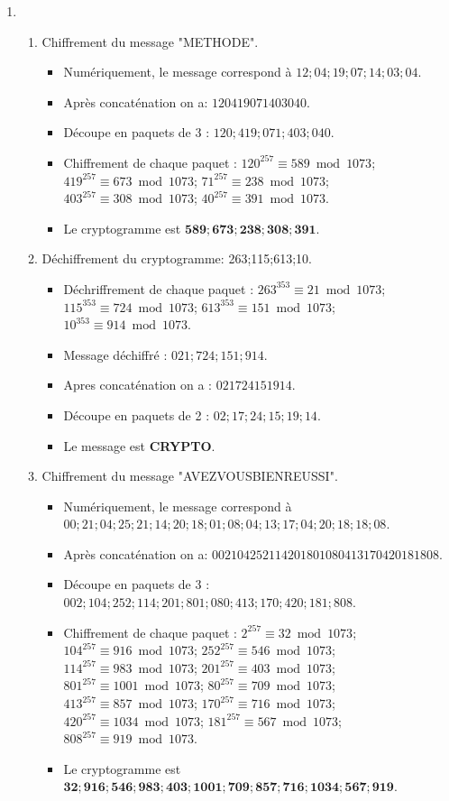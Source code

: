 \documentclass{homework}
\begin{document}
	\exercise
		\begin{enumerate}
			\item 
				\begin{enumerate}
					\item Chiffrement du message "METHODE".
						\begin{itemize}
							\item Numériquement, le message correspond à $12;04;19;07;14;03;04.$
							\item Après concaténation on a: $120419071403040.$
							\item Découpe en paquets de 3 : $120;419;071;403;040.$
							\item Chiffrement de chaque paquet : $120^{257} \equiv 589 \bmod 1073$; $419^{257} \equiv 673 \bmod 1073$; $71^{257} \equiv 238 \bmod 1073$; $403^{257} \equiv 308 \bmod 1073$; $40^{257} \equiv 391 \bmod 1073$.
							\item Le cryptogramme est $\mathbf{589;673;238;308;391}$.
						\end{itemize}
					
					\item Déchiffrement du cryptogramme: 263;115;613;10.
						\begin{itemize}
							\item Déchriffrement de chaque paquet : $263^{353} \equiv 21 \bmod 1073$; $115^{353} \equiv 724 \bmod 1073$; $613^{353} \equiv 151 \bmod 1073$; $10^{353} \equiv 914 \bmod 1073$.
							\item Message déchiffré : $021; 724; 151; 914$.
							\item Apres concaténation on a : $021724151914$.
							\item Découpe en paquets de 2 : $02; 17; 24; 15; 19; 14$.
							\item Le message est \textbf{CRYPTO}.
						\end{itemize}
					
					\item Chiffrement du message "AVEZVOUSBIENREUSSI".
						\begin{itemize}
							\item Numériquement, le message correspond à $00;21;04;25;21;14;20;18;01;08;04;13;17;04;20;18;18;08$.
							\item Après concaténation on a: $002104252114201801080413170420181808$.
							\item Découpe en paquets de 3 : $002;104;252;114;201;801;080;413;170;420;181;808$.
							\item Chiffrement de chaque paquet : $2^{257} \equiv 32 \bmod 1073$; $104^{257} \equiv 916 \bmod 1073$; $252^{257} \equiv 546 \bmod 1073$; $114^{257} \equiv 983 \bmod 1073$; $201^{257} \equiv 403 \bmod 1073$; $801^{257} \equiv 1001 \bmod 1073$; $80^{257} \equiv 709 \bmod 1073$; $413^{257} \equiv 857 \bmod 1073$; $170^{257} \equiv 716 \bmod 1073$; $420^{257} \equiv 1034 \bmod 1073$; $181^{257} \equiv 567 \bmod 1073$;$808^{257} \equiv 919 \bmod 1073$.
							\item Le cryptogramme est $\mathbf{32;916;546;983;403;1001;709;857;716;1034;567;919}$.
						\end{itemize}
					

\end{enumerate}
\end{enumerate}
\end{document}
